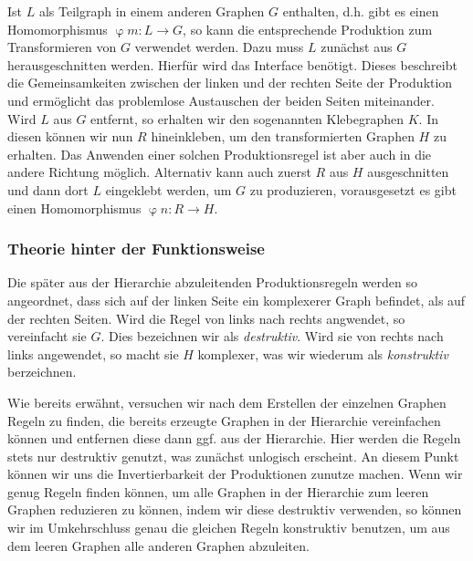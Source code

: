 Ist \(L\) als Teilgraph in einem anderen Graphen \(G\) enthalten, d.h. gibt es einen Homomorphismus \(\upvarphi m: L \rightarrow G\), so kann die entsprechende
Produktion zum Transformieren von \(G\) verwendet werden. Dazu muss \(L\) zunächst aus \(G\) herausgeschnitten werden. Hierfür wird das Interface
benötigt. Dieses beschreibt die Gemeinsamkeiten zwischen der linken und der rechten Seite der Produktion und ermöglicht das problemlose Austauschen
der beiden Seiten miteinander. Wird \(L\) aus \(G\) entfernt, so erhalten wir den sogenannten Klebegraphen \(K\). In diesen können wir nun \(R\)
hineinkleben, um den transformierten Graphen \(H\) zu erhalten. Das Anwenden einer solchen Produktionsregel ist aber auch in die andere Richtung
möglich. Alternativ kann auch zuerst \(R\) aus \(H\) ausgeschnitten und dann dort \(L\) eingeklebt werden, um \(G\) zu produzieren, vorausgesetzt
es gibt einen Homomorphismus \(\upvarphi n: R \rightarrow H\). \cite{7_ehrig_et_al}

\subsubsection{Theorie hinter der Funktionsweise}
Die später aus der Hierarchie abzuleitenden Produktionsregeln werden so angeordnet, dass sich auf der linken Seite ein komplexerer Graph befindet,
als auf der rechten Seiten. Wird die Regel von links nach rechts angwendet, so vereinfacht sie \(G\). Dies bezeichnen wir als \textit{destruktiv}.
Wird sie von rechts nach links angewendet, so macht sie \(H\) komplexer, was wir wiederum als \textit{konstruktiv} berzeichnen.

Wie bereits erwähnt, versuchen wir nach dem Erstellen der einzelnen Graphen Regeln zu finden, die bereits erzeugte Graphen in der Hierarchie
vereinfachen können und entfernen diese dann ggf. aus der Hierarchie. Hier werden die Regeln stets nur destruktiv genutzt, was zunächst unlogisch
erscheint. An diesem Punkt können wir uns die Invertierbarkeit der Produktionen zunutze machen. Wenn wir genug Regeln finden können, um alle Graphen
in der Hierarchie zum leeren Graphen reduzieren zu können, indem wir diese destruktiv verwenden, so können wir im Umkehrschluss genau die gleichen
Regeln konstruktiv benutzen, um aus dem leeren Graphen alle anderen Graphen abzuleiten.

